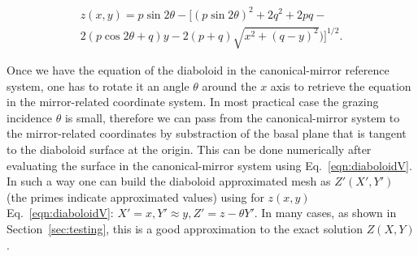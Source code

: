 \documentclass{iucr}              %
\newcommand{\inred}[1]{{\color{red}#1}}
\begin{document}
\begin{multline}
\label{eqn:diaboloidV}
z(x,y) = p \sin2\theta - 
[ (p \sin{2\theta})^2 + 2q^2 + 2 p q - \\
2 (p \cos{2\theta} + q) y - 
2 (p+q)  \sqrt{x^2 + (q-y)^2}) 
]^{1/2}.
\end{multline}






Once we have the equation of the diaboloid in the canonical-mirror reference system, one has to rotate it an angle $\theta$ around the $x$ axis to retrieve the equation in the mirror-related coordinate system. 
In most practical case the grazing incidence $\theta$ is small, therefore we can pass from the canonical-mirror system to the mirror-related coordinates by substraction of the basal plane that is tangent to the diaboloid surface at the origin. This can be done numerically after evaluating the surface in the canonical-mirror system using Eq.~\ref{eqn:diaboloidV}. \inred{
In such a way one can build the diaboloid approximated mesh as $Z'(X',Y')$ (the primes indicate approximated values) using for $z(x,y)$ Eq.~\ref{eqn:diaboloidV}: $X'=x, Y'\approx y, Z'=z - \theta Y'$. In many cases, as shown in Section~\ref{sec:testing}, this is a good approximation to the exact solution $Z(X,Y)$. }  

\end{document}

